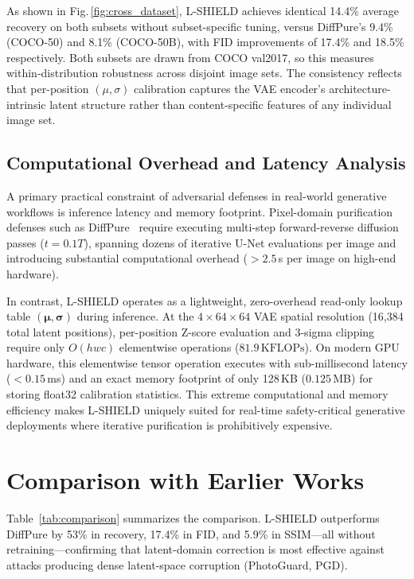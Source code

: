 \documentclass[conference]{IEEEtran}
\begin{document}
As shown in Fig.\,\ref{fig:cross_dataset}, L-SHIELD achieves identical 14.4\% average recovery on both subsets without subset-specific tuning, versus DiffPure's 9.4\% (COCO-50) and 8.1\% (COCO-50B), with FID improvements of 17.4\% and 18.5\% respectively. Both subsets are drawn from COCO val2017, so this measures within-distribution robustness across disjoint image sets. The consistency reflects that per-position $(\mu,\sigma)$ calibration captures the VAE encoder's architecture-intrinsic latent structure rather than content-specific features of any individual image set.

\subsection{Computational Overhead and Latency Analysis}

A primary practical constraint of adversarial defenses in real-world generative workflows is inference latency and memory footprint. Pixel-domain purification defenses such as DiffPure~\cite{nie2022diffusion} require executing multi-step forward-reverse diffusion passes ($t=0.1T$), spanning dozens of iterative U-Net evaluations per image and introducing substantial computational overhead ($>2.5$\,s per image on high-end hardware).

In contrast, L-SHIELD operates as a lightweight, zero-overhead read-only lookup table $(\boldsymbol{\mu}, \boldsymbol{\sigma})$ during inference. At the $4\times64\times64$ VAE spatial resolution (16,384 total latent positions), per-position Z-score evaluation and 3-sigma clipping require only $O(hwc)$ elementwise operations ($81.9\,\text{KFLOPs}$). On modern GPU hardware, this elementwise tensor operation executes with sub-millisecond latency ($<0.15$\,ms) and an exact memory footprint of only 128\,KB ($0.125$\,MB) for storing float32 calibration statistics. This extreme computational and memory efficiency makes L-SHIELD uniquely suited for real-time safety-critical generative deployments where iterative purification is prohibitively expensive.

\section{Comparison with Earlier Works}

Table~\ref{tab:comparison} summarizes the comparison.
L-SHIELD outperforms DiffPure by 53\% in recovery, 17.4\% in FID, and 5.9\%
in SSIM---all without retraining---confirming that latent-domain correction
is most effective against attacks producing dense latent-space corruption (PhotoGuard, PGD).
\end{document}
